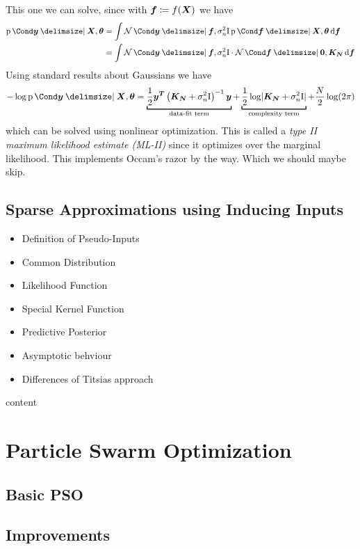 This one we can solve, since with $\bm{f} \coloneqq f(\bm{X})$ we have
\begin{align}
    \Prob{\mat{y} \given \mat{X}, \mat{\theta}} &= \int \Gaussian{\mat{y} \given \mat{f}, \sigma_n^2 \Eye} \Prob{\mat{f} \given \mat{X}, \mat{\theta}} \diff \mat{f} \\
    &= \int \Gaussian{\mat{y} \given \mat{f}, \sigma_n^2 \Eye} \cdot \Gaussian{\mat{f} \given \mat{0}, \mat{K_N}} \diff \mat{f}
\end{align}
Using standard results about Gaussians we have
\begin{align}
-\log\Prob{\mat{y} \given \mat{X}, \mat{\theta}} =
    \underbracket[1pt]{\frac{1}{2} \mat{y^T} \left( \mat{K_N} + \sigma_n^2 \Eye \right)^{-1} \mat{y}}_{\text{data-fit term}} +
    \underbracket[1pt]{\frac{1}{2} \log \abs{\mat{K_N} + \sigma_n^2 \Eye}}_{\text{complexity term}} +
    \frac{N}{2} \log(2\pi)
\end{align}
which can be solved using nonlinear optimization.
This is called a \emph{type II maximum likelihood estimate (ML-II)} since it optimizes over the marginal likelihood.
This implements Occam's razor by the way. Which we should maybe skip.

\subsection{Sparse Approximations using Inducing Inputs}
\begin{itemize}
    \item Definition of Pseudo-Inputs
    \item Common Distribution
    \item Likelihood Function
    \item Special Kernel Function
    \item Predictive Posterior
    \item Asymptotic behviour
    \item Differences of Titsias approach
\end{itemize}
\begin{lemma}
    content
\end{lemma}

\section{Particle Swarm Optimization}
\subsection{Basic PSO}
\subsection{Improvements}

